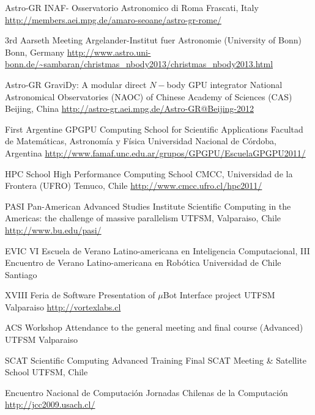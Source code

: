 \documentclass[11pt,a4paper]{moderncv}
\begin{document}
        {Astro-GR}
        {INAF- Osservatorio Astronomico di Roma}
        {Frascati, Italy}
        {\url{http://members.aei.mpg.de/amaro-seoane/astro-gr-rome/}}
        {}

        {3rd Aarseth Meeting}
        {Argelander-Institut fuer Astronomie (University of Bonn)}
        {Bonn, Germany}
        {\url{http://www.astro.uni-bonn.de/~sambaran/christmas_nbody2013/christmas_nbody2013.html}}
        {}

        {Astro-GR}
        {GraviDy: A modular direct $N-$body GPU integrator}
        {National Astronomical Observatories (NAOC) of Chinese Academy of Sciences
        (CAS)}
        {Beijing, China}
        {\url{http://astro-gr.aei.mpg.de/Astro-GR@Beijing-2012}}

        {First Argentine GPGPU Computing School for Scientific Applications}
        {Facultad de Matemáticas, Astronomía y Física}
        {Universidad Nacional de Córdoba, Argentina}
        {\url{http://www.famaf.unc.edu.ar/grupos/GPGPU/EscuelaGPGPU2011/}}
        {}

        {HPC School}
        {High Performance Computing School}
        {CMCC, Universidad de la Frontera (UFRO)}
        {Temuco, Chile}
        {\url{http://www.cmcc.ufro.cl/hpc2011/}}

        {PASI}
        {Pan-American Advanced Studies Institute}
        {Scientific Computing in the Americas: the challenge of massive parallelism}
        {UTFSM, Valparaiso, Chile}
        {\url{http://www.bu.edu/pasi/}}

        {EVIC}
        {VI Escuela de Verano Latino-americana en Inteligencia Computacional, %
        III Encuentro de Verano Latino-americana en Robótica}
        {Universidad de Chile}
        {Santiago}
        {}

        {XVIII Feria de Software}
        {Presentation of $\mu$Bot Interface project}
        {UTFSM}
        {Valparaiso}
        {\url{http://vortexlabs.cl}}

        {ACS Workshop}
        {Attendance to the general meeting and final course (Advanced)}
        {UTFSM}
        {Valparaiso}
        {}

        {SCAT}
        {Scientific Computing Advanced Training}
        {Final SCAT Meeting \& Satellite School}
        {UTFSM, Chile}
        {}

        {Encuentro Nacional de Computación}
        {Jornadas Chilenas de la Computación}
        {}
        {}
        {\url{http://jcc2009.usach.cl/}}
\end{document}
